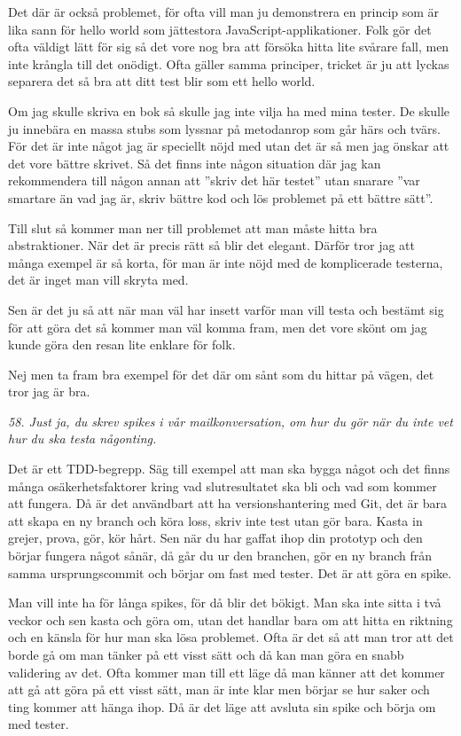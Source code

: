 \documentclass[11pt]{article}
\begin{document}
Det där är också problemet, för ofta vill man ju demonstrera en princip som är lika sann för hello world som jättestora JavaScript-applikationer. Folk gör det ofta väldigt lätt för sig så det vore nog bra att försöka hitta lite svårare fall, men inte krångla till det onödigt. Ofta gäller samma principer, tricket är ju att lyckas separera det så bra att ditt test blir som ett hello world.

Om jag skulle skriva en bok så skulle jag inte vilja ha med mina tester. De skulle ju innebära en massa stubs som lyssnar på metodanrop som går härs och tvärs. För det är inte något jag är speciellt nöjd med utan det är så men jag önskar att det vore bättre skrivet. Så det finns inte någon situation där jag kan rekommendera till någon annan att ”skriv det här testet” utan snarare ”var smartare än vad jag är, skriv bättre kod och lös problemet på ett bättre sätt”.

Till slut så kommer man ner till problemet att man måste hitta bra abstraktioner. När det är precis rätt så blir det elegant. Därför tror jag att många exempel är så korta, för man är inte nöjd med de komplicerade testerna, det är inget man vill skryta med.

Sen är det ju så att när man väl har insett varför man vill testa och bestämt sig för att göra det så kommer man väl komma fram, men det vore skönt om jag kunde göra den resan lite enklare för folk.

Nej men ta fram bra exempel för det där om sånt som du hittar på vägen, det tror jag är bra.

\emph{58. Just ja, du skrev spikes i vår mailkonversation, om hur du gör när du inte vet hur du ska testa någonting.}

Det är ett TDD-begrepp. Säg till exempel att man ska bygga något och det finns många osäkerhetsfaktorer kring vad slutresultatet ska bli och vad som kommer att fungera. Då är det användbart att ha versionshantering med Git, det är bara att skapa en ny branch och köra loss, skriv inte test utan gör bara. Kasta in grejer, prova, gör, kör hårt. Sen när du har gaffat ihop din prototyp och den börjar fungera något sånär, då går du ur den branchen, gör en ny branch från samma ursprungscommit och börjar om fast med tester. Det är att göra en spike.

Man vill inte ha för långa spikes, för då blir det bökigt. Man ska inte sitta i två veckor och sen kasta och göra om, utan det handlar bara om att hitta en riktning och en känsla för hur man ska lösa problemet. Ofta är det så att man tror att det borde gå om man tänker på ett visst sätt och då kan man göra en snabb validering av det. Ofta kommer man till ett läge då man känner att det kommer att gå att göra på ett visst sätt, man är inte klar men börjar se hur saker och ting kommer att hänga ihop. Då är det läge att avsluta sin spike och börja om med tester.
\end{document}
